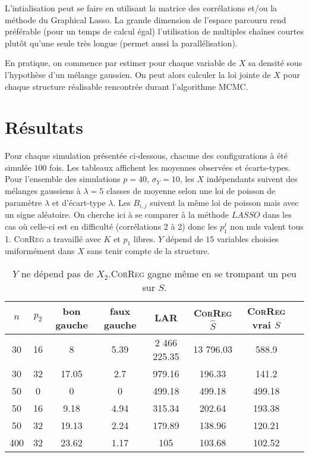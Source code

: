 \documentclass[12pt]{article}
\begin{document}
L'intialisation peut se faire en utilisant la matrice des corrélations et/ou la méthode du Graphical Lasso\cite{friedman2008sparse}.		
La grande dimension de l'espace parcouru rend préférable  (pour un temps de calcul égal) l'utilisation de multiples chaînes courtes plutôt qu'une seule très longue (permet aussi la parallélisation).
	
	En pratique, on commence par estimer pour chaque variable de $X$ sa densité sous l'hypothèse d'un mélange gaussien. On peut alors calculer la loi jointe de $X$ pour chaque structure réalisable rencontrée durant l'algorithme MCMC.
\section{Résultats}	
Pour chaque simulation présentée ci-dessous, chacune des configurations à été simulée $100$ fois. Les tableaux affichent les moyennes observées et écarts-types. Pour l'ensemble des simulations $p=40$, $\sigma_Y=10$, les $X$ indépendants suivent des mélanges gaussiens à $\lambda=5$ classes de moyenne selon une loi de poisson de paramètre $\lambda$ et d'écart-type $\lambda$. Les $B_{i,j}$ suivent la même loi de poisson mais avec un signe aléatoire. On cherche ici à se comparer à la méthode $LASSO$ dans les cas où celle-ci est en difficulté (corrélations 2 à 2) donc les $p_1^j$ non nuls valent tous 1. \textsc{CorReg}  a  travaillé avec $K$ et $p_1$ libres. $Y$ dépend de $15$ variables choisies uniformément dans $X$ sans tenir compte de la structure.

\begin{table}
\centering
\begin{tabular}{|c|c|c|c|c|c|c|c|}
\hline 
$n$ & $p_2$ & bon gauche & faux gauche    & LAR  &    \textsc{CorReg} $\hat S$& \textsc{CorReg} vrai $S$\\ 
\hline 
30 & 16 &  8 & 5.39 & 2 466 225.35 & 13 796.03 & 588.9\\ 
\hline 
30 & 32 & 17.05 & 2.7 & 979.16 & 196.33 & 141.2\\ 
\hline 
\hline 
50 & 0 & 0 & 0 & 499.18 & 499.18 & 499.18 \\ 
\hline 
50 & 16 & 9.18 & 4.94 & 315.34 & 202.64 & 193.38 \\ 
\hline 
50 & 32 & 19.13 & 2.24 & 179.89 & 138.96 & 120.21 \\ 
\hline \hline
400 & 32 &23.62 & 1.17 & 105 & 103.68 & 102.52 \\ 
\hline 
\end{tabular} 
\caption{$Y$ ne dépend pas de $X_2$.\textsc{CorReg} gagne même en se trompant un peu sur $S$.} \label{tableMSEsimp20}
\end{table}
\end{document}
